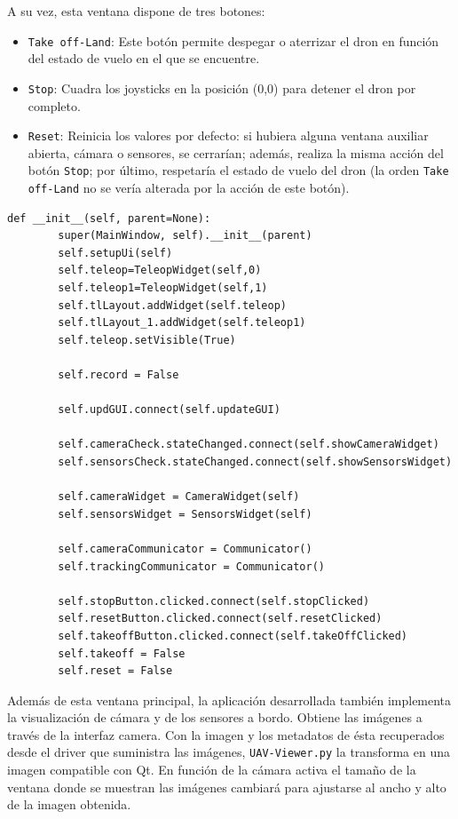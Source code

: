 A su vez, esta ventana dispone de tres botones:
\begin{itemize}
\item \texttt{Take off-Land}: Este botón permite despegar o aterrizar el dron en función del estado de vuelo en el que se encuentre.
\item \texttt{Stop}: Cuadra los joysticks en la posición (0,0) para detener el dron por completo.
\item \texttt{Reset}: Reinicia los valores por defecto: si hubiera alguna ventana auxiliar abierta, cámara o sensores, se cerrarían; además, realiza la misma acción del botón \texttt{Stop}; por último, respetaría el estado de vuelo del dron (la orden \texttt{Take off-Land} no se vería alterada por la acción de este botón).
\end{itemize}

\begin{lstlisting}[frame=single]
 def __init__(self, parent=None):
        super(MainWindow, self).__init__(parent)
        self.setupUi(self)
        self.teleop=TeleopWidget(self,0)
        self.teleop1=TeleopWidget(self,1)
        self.tlLayout.addWidget(self.teleop)
        self.tlLayout_1.addWidget(self.teleop1)
        self.teleop.setVisible(True)

        self.record = False

        self.updGUI.connect(self.updateGUI)

        self.cameraCheck.stateChanged.connect(self.showCameraWidget)
        self.sensorsCheck.stateChanged.connect(self.showSensorsWidget)

        self.cameraWidget = CameraWidget(self)
        self.sensorsWidget = SensorsWidget(self)

        self.cameraCommunicator = Communicator()
        self.trackingCommunicator = Communicator()

        self.stopButton.clicked.connect(self.stopClicked)
        self.resetButton.clicked.connect(self.resetClicked)
        self.takeoffButton.clicked.connect(self.takeOffClicked)
        self.takeoff = False
        self.reset = False
\end{lstlisting}

Además de esta ventana principal, la aplicación desarrollada también implementa la visualización de cámara y de los sensores a bordo. Obtiene las imágenes a través de la interfaz camera. Con la imagen y los metadatos de ésta recuperados desde el driver que suministra las imágenes, \texttt{UAV-Viewer.py} la transforma en una imagen compatible con Qt. En función de la cámara activa el tamaño de la ventana donde se muestran las imágenes cambiará para ajustarse al ancho y alto de la imagen obtenida.

